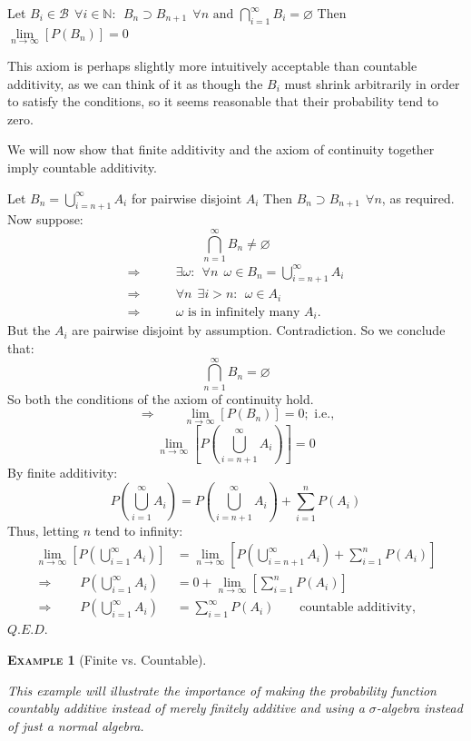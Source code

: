 \documentclass[12pt,a4paper]{article}
\newtheorem{example}{\textsc{Example}}[section]
\begin{document}
 Let $B_i\in\mathcal{B}\:\:\forall i\in\mathbb{N}:\:\:B_n\supset B_{n+1}\:\:\forall n \text{ and }\bigcap\limits_{i=1}^{\infty}B_i=\varnothing$ Then $\lim\limits_{n\rightarrow\infty}[P(B_n)]=0$\par
\vspace{12pt}

This axiom is perhaps slightly more intuitively acceptable than countable additivity, as we can think of it as though the $B_i$ must shrink arbitrarily in order to satisfy the conditions, so it seems reasonable that their probability tend to zero.

We will now show that finite additivity and the axiom of continuity together imply countable additivity.\par
Let $B_n=\bigcup_{i=n+1}^{\infty}A_i$ for pairwise disjoint $A_i$ Then $B_{n}\supset B_{n+1}\:\:\forall n$, as required. Now suppose:
$$\bigcap_{n=1}^{\infty}B_n\neq\varnothing$$
\begin{align*}
\Rightarrow&\qquad\exists\omega :\:\:\forall n\:\:\omega\in B_n=\bigcup_{i=n+1}^{\infty}A_i\\
\Rightarrow&\qquad\forall n\:\:\exists i>n:\:\:\omega\in A_i\\
\Rightarrow&\qquad\omega \text{ is in infinitely many }A_i.
\end{align*}
But the $A_i$ are pairwise disjoint by assumption. Contradiction. So we conclude that:
$$\bigcap_{n=1}^{\infty}B_n =\varnothing$$
So both the conditions of the axiom of continuity hold.
$$\Rightarrow\qquad \lim_{n\rightarrow\infty}[P(B_n)]=0;\text{ i.e.,}$$
$$\lim_{n\rightarrow\infty}[P(\bigcup_{i=n+1}^{\infty}A_i)]=0$$
By finite additivity:
$$P(\bigcup_{i=1}^{\infty}A_i) = P(\bigcup_{i=n+1}^{\infty}A_i) + \sum_{i=1}^{n}P(A_i)$$
Thus, letting $n$ tend to infinity:
\begin{align*}
\lim_{n\rightarrow\infty}[P(\bigcup_{i=1}^{\infty}A_i)] &= \lim_{n\rightarrow\infty}[P(\bigcup_{i=n+1}^{\infty}A_i) + \sum_{i=1}^{n}P(A_i)] \\
\Rightarrow\qquad P(\bigcup_{i=1}^{\infty}A_i) &= 0 + \lim_{n\rightarrow\infty}[\sum_{i=1}^{n}P(A_i)] \\
\Rightarrow\qquad P(\bigcup_{i=1}^{\infty}A_i) &= \sum_{i=1}^{\infty}P(A_i)\qquad\text{countable additivity,}
\end{align*}\hfill $Q.E.D.$

\begin{example}[Finite vs. Countable]$\;$\par
\vspace{12pt}

This example will illustrate the importance of making the probability function countably additive instead of merely finitely additive and using a $\sigma$-algebra instead of just a normal algebra.
\end{example}
\end{document}
